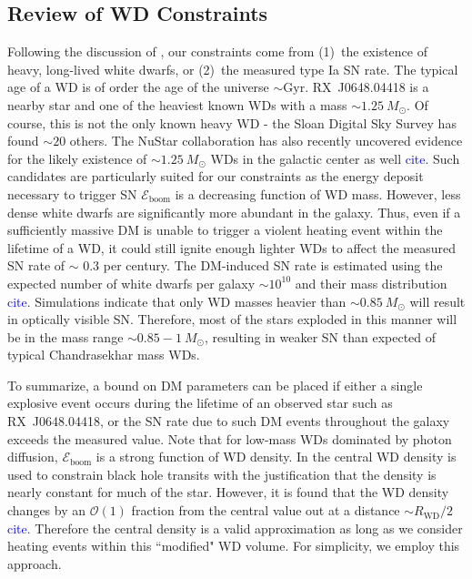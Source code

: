 \documentclass[twocolumn,showpacs,preprintnumbers,amsmath,amssymb,prd]{revtex4}
\newcommand{\Eboom}{\mathcal{E}_\text{boom}}
\newcommand{\OO}{\mathcal{O}}
\begin{document}
\subsection{Review of WD Constraints}
Following the discussion of \cite{Graham:2015apa}, our constraints come from (1)~the existence of heavy, long-lived white dwarfs, or (2)~the measured type Ia SN rate. 
The typical age of a WD is of order the age of the universe $\sim \text{Gyr}$.
RX~J0648.04418 is a nearby star and one of the heaviest known WDs with a mass $\sim 1.25 ~M_{\odot}$. 
Of course, this is not the only known heavy WD - the Sloan Digital Sky Survey has found $\sim 20$ others. 
The NuStar collaboration has also recently uncovered evidence for the likely existence of $\sim 1.25 ~M_{\odot}$ WDs in the galactic center as well \textcolor{blue}{cite}.
Such candidates are particularly suited for our constraints as the energy deposit necessary to trigger SN $\Eboom$ is a decreasing function of WD mass. 
However, less dense white dwarfs are significantly more abundant in the galaxy.
Thus, even if a sufficiently massive DM is unable to trigger a violent heating event within the lifetime of a WD, it could still ignite enough lighter WDs to affect the measured SN rate of $\sim $ 0.3 per century.
The DM-induced SN rate is estimated using the expected number of white dwarfs per galaxy $\sim 10^{10}$ and their mass distribution \textcolor{blue}{cite}.
Simulations indicate that only WD masses heavier than $\sim 0.85 ~M_{\odot}$ will result in optically visible SN.
Therefore, most of the stars exploded in this manner will be in the mass range $\sim 0.85 - 1 ~M_{\odot}$, resulting in weaker SN than expected of typical Chandrasekhar mass WDs.

To summarize, a bound on DM parameters can be placed if either a single explosive event occurs during the lifetime of an observed star such as RX~J0648.04418, or the SN rate due to such DM events throughout the galaxy exceeds the measured value.
Note that for low-mass WDs dominated by photon diffusion, $\Eboom$ is a strong function of WD density. 
In \cite{Graham:2015apa} the central WD density is used to constrain black hole transits with the justification that the density is nearly constant for much of the star.
However, it is found that the WD density changes by an $\OO(1)$ fraction from the central value out at a distance $\sim R_\text{WD}/2$ \textcolor{blue}{cite}. 
Therefore the central density is a valid approximation as long as we consider heating events within this ``modified" WD volume. 
For simplicity, we employ this approach.  
\end{document}
